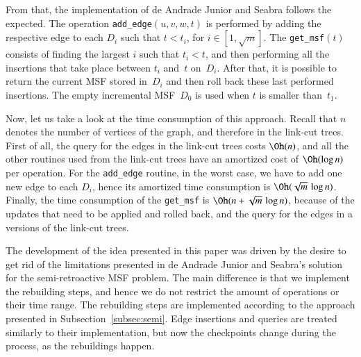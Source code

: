 \documentclass[3p,times,procedia]{elsarticle}
\begin{document}
From that, the implementation of de Andrade Junior and Seabra follows 
the expected.  The operation \texttt{add\_edge}$(u,v,w,t)$ is performed 
by adding the respective edge to each $D_i$ such that $t < t_i$, for
$i \in [1,\sqrt{m}]$.  The \texttt{get\_msf}$(t)$ consists of finding 
the largest $i$ such that $t_i < t$, and then performing all the 
insertions that take place between $t_i$ and~$t$ on~$D_i$.
After that, it is possible to return the current MSF stored 
in~$D_i$ and then roll back these last performed insertions.
The empty incremental MSF~$D_0$ is used when $t$ is smaller than~$t_1$.

Now, let us take a look at the time consumption of this approach.
Recall that $n$ denotes the number of vertices of the graph, 
and therefore in the link-cut trees.  First of all, the query for 
the edges in the link-cut trees costs $\Oh(n)$, and all the other 
routines used from the link-cut trees have an amortized cost of 
$\Oh(\log{n})$ per operation.  For the \texttt{add\_edge} routine, 
in the worst case, we have to add one new edge to each $D_i$, hence 
its amortized time consumption is $\Oh(\sqrt{m}\,\log{n})$. Finally, 
the time consumption of the \texttt{get\_msf} is $\Oh(n+\sqrt{m}\,\log{n})$,
because of the updates that need to be applied and rolled back, 
and the query for the edges in a versions of the link-cut trees.

\medskip

The development of the idea presented in this paper was driven by
the desire to get rid of the limitations presented in de Andrade 
Junior and Seabra's solution for the semi-retroactive MSF problem.  
The main difference is that we implement the rebuilding steps, 
and hence we do not restrict the amount of operations or their time range.
The rebuilding steps are implemented according to 
the approach presented in Subsection~\ref{subsec:semi}.
Edge insertions and queries are treated similarly to their implementation, 
but now the checkpoints change during the process, as the rebuildings happen.

\medskip
\end{document}
